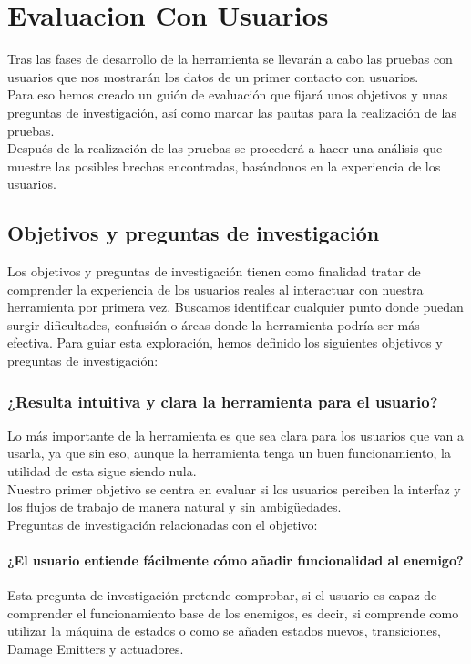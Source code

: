 \setcounter{secnumdepth}{3} %
\chapter{Evaluacion Con Usuarios}
\label{cap:evaluacionConUsuarios}
Tras las fases de desarrollo de la herramienta se llevarán a cabo las pruebas con usuarios que nos mostrarán los datos de un primer contacto con usuarios.\\
Para eso hemos creado un guión de evaluación que fijará unos objetivos y unas preguntas de investigación, así como marcar las pautas para la realización de las pruebas. \\
Después de la realización de las pruebas se procederá a hacer una análisis que muestre las posibles brechas encontradas, basándonos en la experiencia de los usuarios. \\
\section{Objetivos y preguntas de investigación}
Los objetivos y preguntas de investigación tienen como finalidad tratar de comprender la experiencia de los usuarios reales al interactuar con nuestra herramienta por primera vez. Buscamos identificar cualquier punto donde puedan surgir dificultades, confusión o áreas donde la herramienta podría ser más efectiva. Para guiar esta exploración, hemos definido los siguientes objetivos y preguntas de investigación:

\subsection{¿Resulta intuitiva y clara la herramienta para el usuario?}
Lo más importante de la herramienta es que sea clara para los usuarios que van a usarla, ya que sin eso, aunque la herramienta tenga un buen funcionamiento, la utilidad de esta sigue siendo nula.\\
Nuestro primer objetivo se centra en evaluar si los usuarios perciben la interfaz y los flujos de trabajo de manera natural y sin ambigüedades.\\

Preguntas de investigación relacionadas con el objetivo:
\subsubsection{¿El usuario entiende fácilmente cómo añadir funcionalidad al enemigo?}
Esta pregunta de investigación pretende comprobar, si el usuario es capaz de comprender el funcionamiento base de los enemigos, es decir, si comprende como utilizar la máquina de estados o como se añaden estados nuevos, transiciones, Damage Emitters y actuadores.\\

